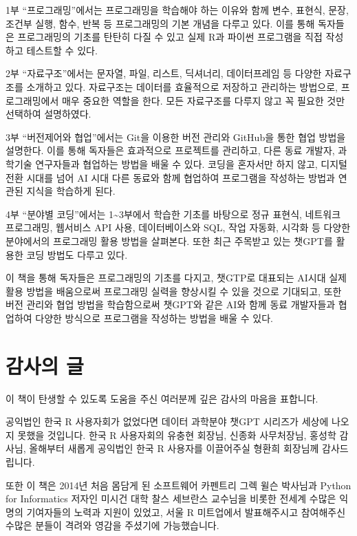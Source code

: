 \documentclass[
  letterpaper,
]{book}
\begin{document}
1부 ``프로그래밍''에서는 프로그래밍을 학습해야 하는 이유와 함께 변수,
표현식, 문장, 조건부 실행, 함수, 반복 등 프로그래밍의 기본 개념을 다루고
있다. 이를 통해 독자들은 프로그래밍의 기초를 탄탄히 다질 수 있고 실제
R과 파이썬 프로그램을 직접 작성하고 테스트할 수 있다.

2부 ``자료구조''에서는 문자열, 파일, 리스트, 딕셔너리, 데이터프레임 등
다양한 자료구조를 소개하고 있다. 자료구조는 데이터를 효율적으로 저장하고
관리하는 방법으로, 프로그래밍에서 매우 중요한 역할을 한다. 모든
자료구조를 다루지 않고 꼭 필요한 것만 선택하여 설명하였다.

3부 ``버전제어와 협업''에서는 Git을 이용한 버전 관리와 GitHub을 통한
협업 방법을 설명한다. 이를 통해 독자들은 효과적으로 프로젝트를 관리하고,
다른 동료 개발자, 과학기술 연구자들과 협업하는 방법을 배울 수 있다.
코딩을 혼자서만 하지 않고, 디지털 전환 시대를 넘어 AI 시대 다른 동료와
함께 협업하여 프로그램을 작성하는 방법과 연관된 지식을 학습하게 된다.

4부 ``분야별 코딩''에서는 1\textasciitilde3부에서 학습한 기초를 바탕으로
정규 표현식, 네트워크 프로그래밍, 웹서비스 API 사용, 데이터베이스와 SQL,
작업 자동화, 시각화 등 다양한 분야에서의 프로그래밍 활용 방법을
살펴본다. 또한 최근 주목받고 있는 챗GPT를 활용한 코딩 방법도 다루고
있다.

이 책을 통해 독자들은 프로그래밍의 기초를 다지고, 챗GTP로 대표되는
AI시대 실제 활용 방법을 배움으로써 프로그래밍 실력을 향상시킬 수 있을
것으로 기대되고, 또한 버전 관리와 협업 방법을 학습함으로써 챗GPT와 같은
AI와 함께 동료 개발자들과 협업하여 다양한 방식으로 프로그램을 작성하는
방법을 배울 수 있다.

\section*{감사의 글}\label{uxac10uxc0acuxc758-uxae00}


이 책이 탄생할 수 있도록 도움을 주신 여러분께 깊은 감사의 마음을
표합니다.

공익법인 한국 R 사용자회가 없었다면 데이터 과학분야 챗GPT 시리즈가
세상에 나오지 못했을 것입니다. 한국 R 사용자회의 유충현 회장님, 신종화
사무처장님, 홍성학 감사님, 올해부터 새롭게 공익법인 한국 R 사용자를
이끌어주실 형환희 회장님께 감사드립니다.

또한 이 책은 2014년 처음 몸담게 된 소프트웨어 카펜트리 그렉 윌슨
박사님과 Python for Informatics 저자인 미시건 대학 찰스 세브란스
교수님을 비롯한 전세계 수많은 익명의 기여자들의 노력과 지원이 있었고,
서울 R 미트업에서 발표해주시고 참여해주신 수많은 분들이 격려와 영감을
주셨기에 가능했습니다.
\end{document}
